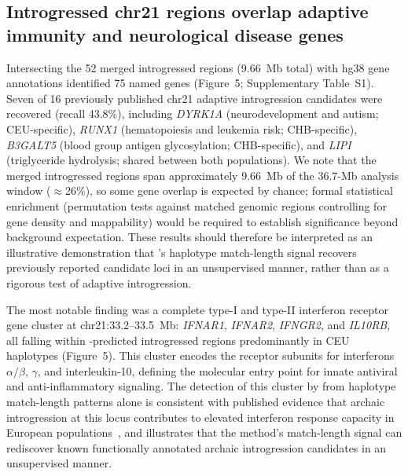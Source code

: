 \subsection*{Introgressed chr21 regions overlap adaptive immunity and neurological disease genes}

Intersecting the 52 merged introgressed regions (9.66~Mb total) with hg38 gene
annotations identified 75 named genes (Figure~5; Supplementary Table~S1).
Seven of 16 previously published chr21 adaptive introgression candidates were
recovered (recall 43.8\%), including \emph{DYRK1A} (neurodevelopment and autism;
CEU-specific), \emph{RUNX1} (hematopoiesis and leukemia risk; CHB-specific),
\emph{B3GALT5} (blood group antigen glycosylation; CHB-specific), and
\emph{LIPI} (triglyceride hydrolysis; shared between both populations).
We note that the merged introgressed regions span approximately 9.66~Mb of the
36.7-Mb analysis window ($\approx$26\%), so some gene overlap is expected
by chance; formal statistical enrichment (permutation tests against matched
genomic regions controlling for gene density and mappability) would be required
to establish significance beyond background expectation.
These results should therefore be interpreted as an illustrative demonstration
that \AP{}'s haplotype match-length signal recovers previously reported
candidate loci in an unsupervised manner, rather than as a rigorous
test of adaptive introgression.

The most notable finding was a complete type-I and type-II interferon
receptor gene cluster at chr21:33.2--33.5~Mb: \emph{IFNAR1}, \emph{IFNAR2},
\emph{IFNGR2}, and \emph{IL10RB}, all falling within \AP{}-predicted
introgressed regions predominantly in CEU haplotypes (Figure~5).
This cluster encodes the receptor subunits for interferons $\alpha/\beta$,
$\gamma$, and interleukin-10, defining the molecular entry point for innate
antiviral and anti-inflammatory signaling.
The detection of this cluster by \AP{} from haplotype match-length patterns alone
is consistent with published evidence that archaic introgression at this locus
contributes to elevated interferon response capacity in European
populations~\citep{dannemann2017contribution}, and illustrates that the
method's match-length signal can rediscover known functionally annotated
archaic introgression candidates in an unsupervised manner.

